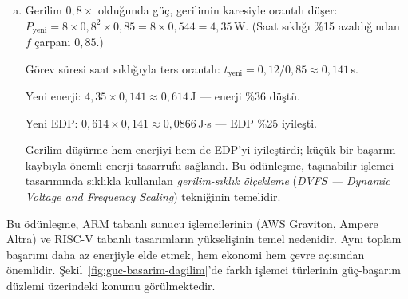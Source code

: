\begin{ornek}[2.14]
\begin{enumerate}[(a)]
    \item Gerilim $0{,}8\times$ olduğunda güç, gerilimin karesiyle orantılı düşer: $P_{\text{yeni}} = 8 \times 0{,}8^2 \times 0{,}85 = 8 \times 0{,}544 = 4{,}35$\,W. (Saat sıklığı \%15 azaldığından $f$ çarpanı $0{,}85$.)

    Görev süresi saat sıklığıyla ters orantılı: $t_{\text{yeni}} = 0{,}12 / 0{,}85 \approx 0{,}141$\,s.

    Yeni enerji: $4{,}35 \times 0{,}141 \approx 0{,}614$\,J --- enerji \%36 düştü.

    Yeni EDP: $0{,}614 \times 0{,}141 \approx 0{,}0866$\,J$\cdot$s --- EDP \%25 iyileşti.

    Gerilim düşürme hem enerjiyi hem de EDP'yi iyileştirdi; küçük bir başarım kaybıyla önemli enerji tasarrufu sağlandı. Bu ödünleşme, taşınabilir işlemci tasarımında sıklıkla kullanılan \emph{gerilim-sıklık ölçekleme} (\emph{DVFS --- Dynamic Voltage and Frequency Scaling}) tekniğinin temelidir.
\end{enumerate}
\end{ornek}

Bu ödünleşme, ARM tabanlı sunucu işlemcilerinin (AWS Graviton, Ampere Altra) ve RISC-V tabanlı tasarımların yükselişinin temel nedenidir. Aynı toplam başarımı daha az enerjiyle elde etmek, hem ekonomi hem çevre açısından önemlidir. Şekil~\ref{fig:guc-basarim-dagilim}'de farklı işlemci türlerinin güç-başarım düzlemi üzerindeki konumu görülmektedir.

